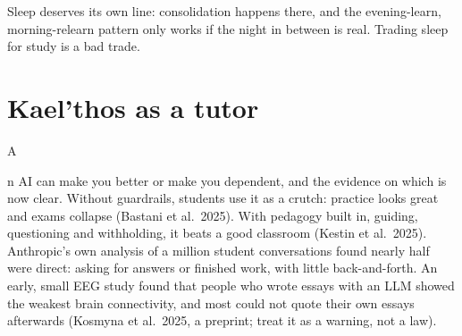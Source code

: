 \documentclass{kaelearn}
\begin{document}

\medskip
Sleep deserves its own line: consolidation happens there, and the evening-learn, morning-relearn pattern only
works if the night in between is real. Trading sleep for study is a bad trade.

\section{Kael'thos as a tutor}

\opening{A}{n AI} can make you better or make you dependent, and the evidence on which is now clear. Without
guardrails, students use it as a crutch: practice looks great and exams collapse (Bastani et al.\ 2025). With
pedagogy built in, guiding, questioning and withholding, it beats a good classroom (Kestin et al.\ 2025).
Anthropic's own analysis of a million student conversations found nearly half were direct: asking for answers or finished work, with little back-and-forth.
An early, small EEG study found that people who wrote essays with an LLM showed the weakest brain
connectivity, and most could not quote their own essays afterwards (Kosmyna et al.\ 2025, a preprint; treat
it as a warning, not a law).
\end{document}
